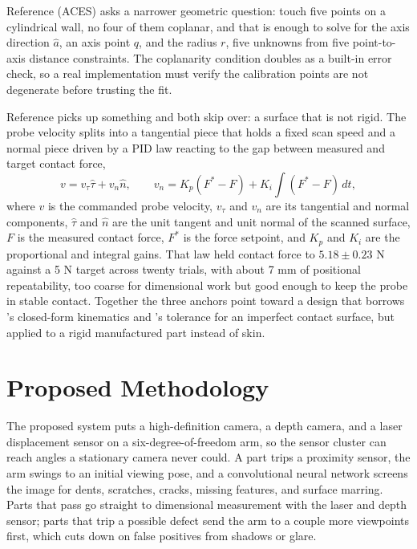 \documentclass[conference]{IEEEtran}
\begin{document}
Reference \cite{ref15} (ACES) asks a narrower geometric question: touch five points on a cylindrical wall, no four of them coplanar, and that is enough to solve for the axis direction $\hat a$, an axis point $q$, and the radius $r$, five unknowns from five point-to-axis distance constraints. The coplanarity condition doubles as a built-in error check, so a real implementation must verify the calibration points are not degenerate before trusting the fit.

Reference \cite{ref17} picks up something \cite{ref15} and \cite{ref18} both skip over: a surface that is not rigid. The probe velocity splits into a tangential piece that holds a fixed scan speed and a normal piece driven by a PID law reacting to the gap between measured and target contact force,
\begin{equation}
v = v_\tau \hat\tau + v_n \hat n, \qquad v_n = K_p(F^* - F) + K_i\!\int (F^*-F)\,dt,
\label{eq:force}
\end{equation}
where $v$ is the commanded probe velocity, $v_\tau$ and $v_n$ are its tangential and normal components, $\hat\tau$ and $\hat n$ are the unit tangent and unit normal of the scanned surface, $F$ is the measured contact force, $F^*$ is the force setpoint, and $K_p$ and $K_i$ are the proportional and integral gains. That law held contact force to $5.18 \pm 0.23$ N against a 5 N target across twenty trials, with about 7 mm of positional repeatability, too coarse for dimensional work but good enough to keep the probe in stable contact. Together the three anchors point toward a design that borrows \cite{ref18}'s closed-form kinematics and \cite{ref17}'s tolerance for an imperfect contact surface, but applied to a rigid manufactured part instead of skin.

\section{Proposed Methodology}
The proposed system puts a high-definition camera, a depth camera, and a laser displacement sensor on a six-degree-of-freedom arm, so the sensor cluster can reach angles a stationary camera never could. A part trips a proximity sensor, the arm swings to an initial viewing pose, and a convolutional neural network screens the image for dents, scratches, cracks, missing features, and surface marring. Parts that pass go straight to dimensional measurement with the laser and depth sensor; parts that trip a possible defect send the arm to a couple more viewpoints first, which cuts down on false positives from shadows or glare.
\end{document}
